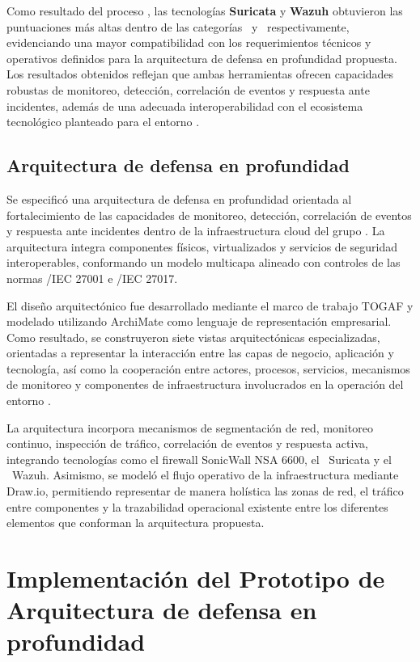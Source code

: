Como resultado del proceso \DAR, las tecnologías \textbf{Suricata} y \textbf{Wazuh} obtuvieron las puntuaciones más altas dentro de las 
categorías \IDPS\ y \SIEM\ respectivamente, evidenciando una mayor compatibilidad con los requerimientos técnicos y operativos definidos 
para la arquitectura de defensa en profundidad propuesta. Los resultados obtenidos reflejan que ambas herramientas ofrecen capacidades 
robustas de monitoreo, detección, correlación de eventos y respuesta ante incidentes, además de una adecuada interoperabilidad con el 
ecosistema tecnológico planteado para el entorno \GRID.

\subsection{Arquitectura de defensa en profundidad}
\noindent

Se especificó una arquitectura de defensa en profundidad orientada al fortalecimiento de las capacidades de monitoreo, detección, 
correlación de eventos y respuesta ante incidentes dentro de la infraestructura cloud del grupo \GRID. La arquitectura integra componentes 
físicos, virtualizados y servicios de seguridad interoperables, conformando un modelo multicapa alineado con controles de las normas 
\ISO/IEC 27001 e \ISO/IEC 27017.

El diseño arquitectónico fue desarrollado mediante el marco de trabajo TOGAF y modelado utilizando ArchiMate como lenguaje de representación 
empresarial. Como resultado, se construyeron siete vistas arquitectónicas especializadas, orientadas a representar la interacción entre las 
capas de negocio, aplicación y tecnología, así como la cooperación entre actores, procesos, servicios, mecanismos de monitoreo y componentes 
de infraestructura involucrados en la operación del entorno \GRID.

La arquitectura incorpora mecanismos de segmentación de red, monitoreo continuo, inspección de tráfico, correlación de eventos y respuesta 
activa, integrando tecnologías como el firewall SonicWall NSA 6600, el \IDPS\ Suricata y el \SIEM\ Wazuh. Asimismo, se modeló el flujo 
operativo de la infraestructura mediante Draw.io, permitiendo representar de manera holística las zonas de red, el tráfico entre 
componentes y la trazabilidad operacional existente entre los diferentes elementos que conforman la arquitectura propuesta.

\section{Implementación del Prototipo de Arquitectura de defensa en profundidad}
\noindent

